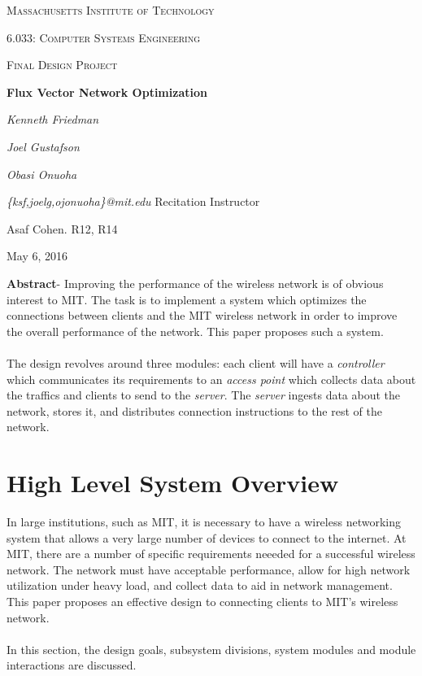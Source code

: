\documentclass[10pt,journal,compsoc]{IEEEtran}
\begin{document}
\begin{titlepage}
	\centering
	{\scshape Massachusetts Institute of Technology  \par}
	\vspace{3cm}
	{\scshape\LARGE 6.033: Computer Systems Engineering\par}
	\vspace{1cm}
	{\scshape\Large Final Design Project \par}
	\vspace{1.5cm}
	{\huge\bfseries Flux Vector Network Optimization\par}
	\vspace{2cm}
	{\Large\itshape Kenneth Friedman\par}
		{\Large\itshape Joel Gustafson \par}
			{\Large\itshape Obasi Onuoha \par}
	\vspace{.25cm}
	\textit{{\small\{ksf,joelg,ojonuoha\}@mit.edu}}
	\vfill
	Recitation Instructor\par
	Asaf Cohen. R12, R14

	\vfill

	{\large May 6, 2016\par}
\end{titlepage}

	
	    \textbf{Abstract}- Improving the performance of the wireless network is of obvious interest to MIT. The task is to implement a system which optimizes the connections between clients and the MIT wireless network in order to improve the overall performance of the network. This paper proposes such a system.\\
		\\
		The design revolves around three modules: each client will have a \emph{controller} which communicates its requirements to an \emph{access point} which collects data about the traffics and clients to send to the \emph{server}. The \emph{server} ingests data about the network, stores it, and distributes connection instructions to the rest of the network.
		
		\section{High Level System Overview}
		
		In large institutions, such as MIT, it is necessary to have a wireless networking system that allows a very large number of devices to connect to the internet. At MIT, there are a number of specific requirements neeeded for a successful wireless network. The network must have acceptable performance, allow for high network utilization under heavy load, and collect data to aid in network management. This paper proposes an effective design to connecting clients to MIT's wireless network.\\
        \\
        In this section, the design goals, subsystem divisions, system modules and module interactions are discussed.
        
\end{document}

